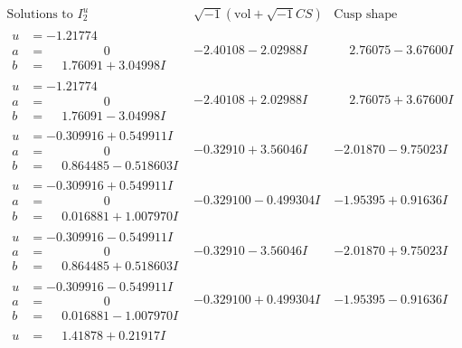 \documentclass[1p]{elsarticle_modified}
\theoremstyle{definition}
\newcommand{\I}{\sqrt{-1}}
\begin{document}
$$\begin{array}{c|c|c}  
\text{Solutions to }I^u_{2}& \I (\text{vol} + \sqrt{-1}CS) & \text{Cusp shape}\\
 \hline 
\begin{aligned}
u &= -1.21774\phantom{ +0.000000I} \\
a &= \phantom{-0.000000 } 0 \\
b &= \phantom{-}1.76091 + 3.04998 I\end{aligned}
 & -2.40108 - 2.02988 I & \phantom{-}2.76075 - 3.67600 I \\ \hline\begin{aligned}
u &= -1.21774\phantom{ +0.000000I} \\
a &= \phantom{-0.000000 } 0 \\
b &= \phantom{-}1.76091 - 3.04998 I\end{aligned}
 & -2.40108 + 2.02988 I & \phantom{-}2.76075 + 3.67600 I \\ \hline\begin{aligned}
u &= -0.309916 + 0.549911 I \\
a &= \phantom{-0.000000 } 0 \\
b &= \phantom{-}0.864485 - 0.518603 I\end{aligned}
 & -0.32910 + 3.56046 I & -2.01870 - 9.75023 I \\ \hline\begin{aligned}
u &= -0.309916 + 0.549911 I \\
a &= \phantom{-0.000000 } 0 \\
b &= \phantom{-}0.016881 + 1.007970 I\end{aligned}
 & -0.329100 - 0.499304 I & -1.95395 + 0.91636 I \\ \hline\begin{aligned}
u &= -0.309916 - 0.549911 I \\
a &= \phantom{-0.000000 } 0 \\
b &= \phantom{-}0.864485 + 0.518603 I\end{aligned}
 & -0.32910 - 3.56046 I & -2.01870 + 9.75023 I \\ \hline\begin{aligned}
u &= -0.309916 - 0.549911 I \\
a &= \phantom{-0.000000 } 0 \\
b &= \phantom{-}0.016881 - 1.007970 I\end{aligned}
 & -0.329100 + 0.499304 I & -1.95395 - 0.91636 I \\ \hline\begin{aligned}
u &= \phantom{-}1.41878 + 0.21917 I \\

\end{aligned}
\end{array}$$
\end{document}

